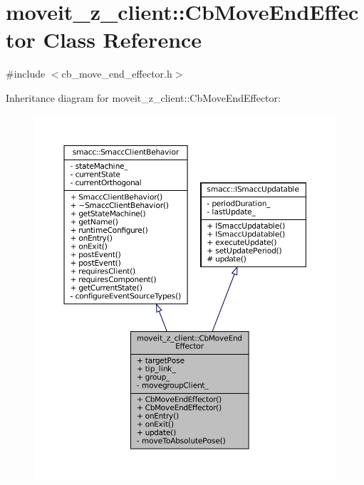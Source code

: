 \hypertarget{classmoveit__z__client_1_1CbMoveEndEffector}{}\section{moveit\+\_\+z\+\_\+client\+:\+:Cb\+Move\+End\+Effector Class Reference}
\label{classmoveit__z__client_1_1CbMoveEndEffector}


{\ttfamily \#include $<$cb\+\_\+move\+\_\+end\+\_\+effector.\+h$>$}



Inheritance diagram for moveit\+\_\+z\+\_\+client\+:\+:Cb\+Move\+End\+Effector\+:
\nopagebreak
\begin{figure}[H]
\begin{center}
\leavevmode
\includegraphics[width=350pt]{classmoveit__z__client_1_1CbMoveEndEffector__inherit__graph}
\end{center}
\end{figure}


